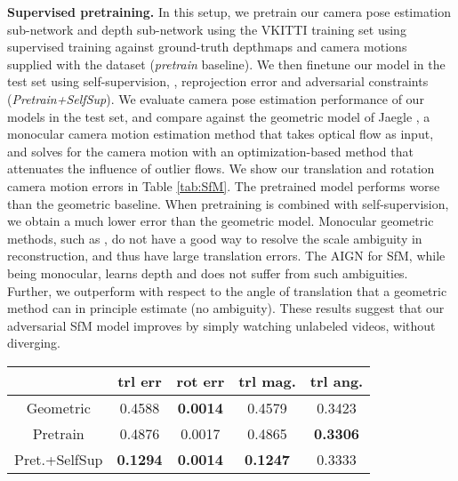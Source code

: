 \documentclass[10pt,twocolumn,letterpaper]{article}
\begin{document}
\begin{bibunit}[ieee]
\textbf{Supervised pretraining.}
In this setup, we pretrain our camera pose estimation sub-network and depth sub-network using the VKITTI training set using  supervised training against ground-truth depthmaps and camera motions supplied with the dataset (\textit{pretrain} baseline).  We then  finetune our model in the test set using self-supervision, \ie, reprojection error and adversarial constraints  (\textit{Pretrain+SelfSup}). 
We  evaluate camera pose estimation performance of our models in the test set, and compare against the geometric model of Jaegle \etal\cite{DBLP:conf/icra/JaeglePD16}, a monocular camera motion estimation method that takes optical flow as input, and solves for the camera motion with an optimization-based method that attenuates the influence of outlier flows. %
We show  our translation and rotation camera motion errors in Table \ref{tab:SfM}.  The pretrained model performs worse than the geometric baseline. When pretraining is combined with self-supervision, we obtain a much lower error than the geometric model.  Monocular geometric methods, such as \cite{DBLP:conf/icra/JaeglePD16}, do not have a good way to resolve the scale ambiguity in reconstruction, and thus have large translation errors. The AIGN for SfM, while being monocular, learns depth and does not suffer from such ambiguities. Further, we outperform \cite{DBLP:conf/icra/JaeglePD16} with respect to the angle of translation that a geometric method can in principle estimate (no ambiguity). 
These results suggest that our adversarial SfM model  improves by simply watching unlabeled videos, without diverging. 
\centering
\begin{tabular}{c c c c c}
 \hline
 & trl err & rot err & trl mag. & trl ang.  \\
 \hline
 Geometric \cite{DBLP:conf/icra/JaeglePD16} & 0.4588 & \textbf{0.0014} & 0.4579 & 0.3423 \\
 Pretrain  & 0.4876 & 0.0017 & 0.4865 & \textbf{0.3306} \\
 Pret.+SelfSup & \textbf{0.1294} & \textbf{0.0014} & \textbf{0.1247} & 0.3333 \\
 \hline
\end{tabular}
\vspace{1mm}
\caption{\textbf{Camera motion estimation in our Virtual KITTI test set}. The self-supervised model outperforms the geometric baseline of Jaegle \etal \cite{DBLP:conf/icra/JaeglePD16}. %
The translation error (column 1) is decomposed into magnitude and angular error in columns 3-4.  } \label{tab:SfM}

\end{bibunit}
\end{document}

